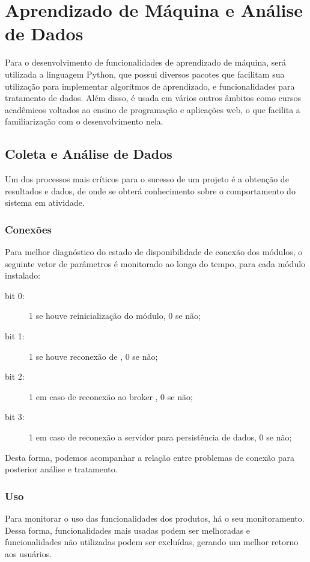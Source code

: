\chapter{Aprendizado de Máquina e Análise de Dados}

Para o desenvolvimento de funcionalidades de aprendizado de máquina, será utilizada a linguagem Python, que possui diversos pacotes que facilitam sua utilização para implementar algoritmos de aprendizado, e funcionalidades para tratamento de dados. Além disso, é usada em vários outros âmbitos como cursos acadêmicos voltados ao ensino de programação e aplicações web, o que facilita a familiarização com o desenvolvimento nela.

\section{Coleta e Análise de Dados}
Um dos processos mais críticos para o sucesso de um projeto é a obtenção de resultados e dados, de onde se obterá conhecimento sobre o comportamento do sistema em atividade.

\subsection{Conexões}
Para melhor diagnóstico do estado de disponibilidade de conexão dos módulos, o seguinte vetor de parâmetros é monitorado ao longo do tempo, para cada módulo instalado:

\begin{description}
	\item [bit 0:] 1 se houve reinicialização do módulo, 0 se não;
	\item [bit 1:] 1 se houve reconexão de \wwifi, 0 se não;
	\item [bit 2:] 1 em caso de reconexão ao broker \wmqtt{}, 0 se não;
	\item [bit 3:] 1 em caso de reconexão a servidor para persistência de dados, 0 se não;
\end{description}

Desta forma, podemos acompanhar a relação entre problemas de conexão para posterior análise e tratamento.

\subsection{Uso}
Para monitorar o uso das funcionalidades dos produtos, há o seu monitoramento. Dessa forma, funcionalidades mais usadas podem ser melhoradas e funcionalidades não utilizadas podem ser excluídas, gerando um melhor retorno aos usuários.

